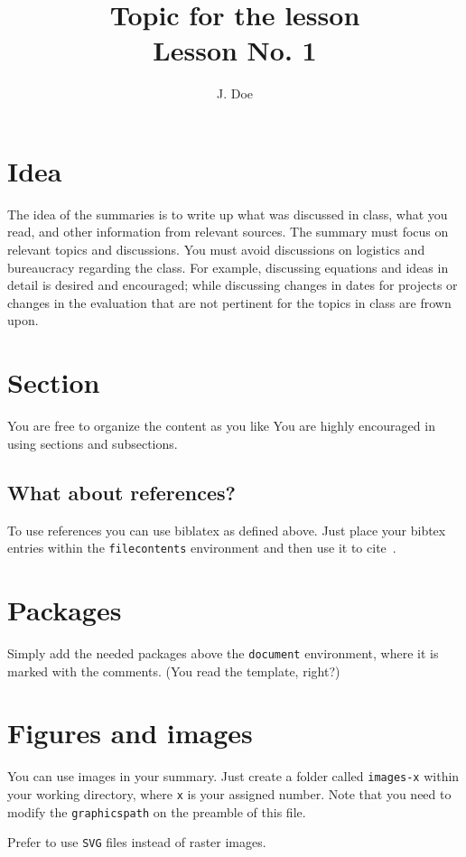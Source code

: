 \documentclass{article}
\begin{document}
\title{Topic for the lesson\\\normalsize Lesson No. 1}
\author{J. Doe}

\maketitle

\section{Idea}

The idea of the summaries is to write up what was discussed in class, what you read, and other information from relevant sources.  The summary must focus on relevant topics and discussions.  You must avoid discussions on logistics and bureaucracy regarding the class.  For example, discussing equations and ideas in detail is desired and encouraged; while discussing changes in dates for projects or changes in the evaluation that are not pertinent for the topics in class are frown upon.

\section{Section}

You are free to organize the content as you like  You are highly encouraged in using sections and subsections.  

\subsection{What about references?}

To use references you can use biblatex as defined above.  Just place your bibtex entries within the \texttt{filecontents} environment and then use it to cite~\cite{Burt1983}.

\section{Packages}

Simply add the needed packages above the \texttt{document} environment, where it is marked with the comments.  (You read the template, right?)

\section{Figures and images}

You can use images in your summary.  Just create a folder called \texttt{images-x} within your working directory, where \texttt{x} is your assigned number.  Note that you need to modify the \texttt{graphicspath} on the preamble of this file. 

Prefer to use \texttt{SVG} files instead of raster images.

\printbibliography
\end{document}
